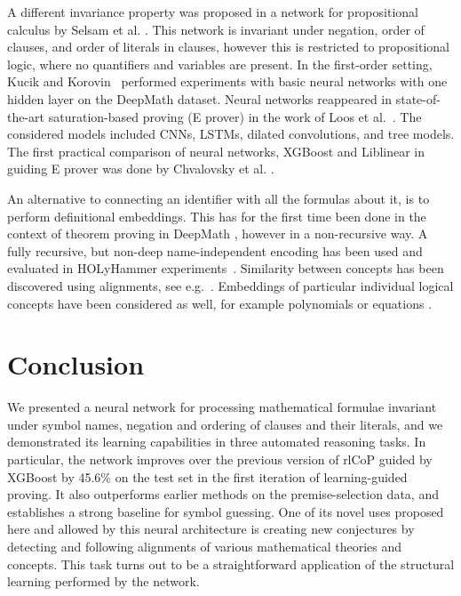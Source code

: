 \documentclass{ecai}
\def\systemname#1{\textsf{#1}\xspace}
\newcommand{\rlc}{\systemname{rlCoP}}
\begin{document}
A different invariance property was proposed in a network for propositional calculus by Selsam et
al. \cite{SelsamLBLMD19}. This network is invariant under negation,
order of clauses, and order of literals in clauses, however this 
is restricted to propositional logic, where no quantifiers and variables
are present. %
In the first-order setting, Kucik and
Korovin~\cite{DBLP:journals/corr/abs-1807-10268} performed experiments with basic neural
networks with one hidden layer on the DeepMath dataset.
Neural networks reappeared in state-of-the-art saturation-based proving (E prover) in the work of Loos et al.~\cite{slgicscklpar17}. The considered models included CNNs, LSTMs, dilated convolutions, and tree models.
The first practical comparison of neural networks, XGBoost and Liblinear in guiding E prover was done by Chvalovsky et al. \cite{ChvalovskyJ0U19}.

An alternative to connecting an identifier with all the formulas about it, is to perform definitional embeddings. This has for the first time been done in the context of theorem proving in DeepMath \cite{IrvingSAECU16ju}, however in a non-recursive way. A fully recursive, but non-deep name-independent encoding has been used and evaluated in HOLyHammer experiments~\cite{ckju-mcs-hh}. Similarity between concepts has been discovered using alignments, see e.g.~\cite{DBLP:conf/lpar/GauthierK15}.
Embeddings of particular individual logical concepts have been considered as well, for example polynomials \cite{AllamanisCKS17} or equations \cite{abs-1803-09123}.



\section{Conclusion}

We presented a neural network for processing mathematical formulae invariant under symbol names, negation and ordering of clauses and their literals, and we demonstrated its learning capabilities in
three automated reasoning tasks.
In particular, the network improves over the previous version of \rlc
guided by XGBoost by 45.6\% on the test set in the first iteration of
learning-guided proving. It also outperforms earlier methods on the
premise-selection data, and establishes a strong baseline for symbol
guessing. One of its novel uses proposed here and allowed by this
neural architecture is creating new conjectures by detecting and
following alignments of various mathematical theories and
concepts. This task turns out to be a straightforward application of the structural
learning performed by the network.
\end{document}
